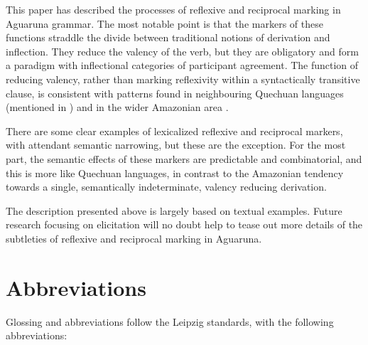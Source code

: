 \documentclass[output=paper]{langscibook}
\begin{document}
This paper has described the processes of reflexive and reciprocal marking in Aguaruna grammar. The most notable point is that the markers of these functions straddle the divide between traditional notions of derivation and inflection. They reduce the valency of the verb, but they are obligatory and form a paradigm with inflectional categories of participant agreement. The function of reducing valency, rather than marking reflexivity within a syntactically transitive clause, is
 consistent with patterns found in neighbouring Quechuan languages (mentioned in ) and in the wider Amazonian area \citep[187]{Birchall2014}.

There are some clear examples of lexicalized reflexive and reciprocal markers, with attendant semantic narrowing, but these are the exception. For the most part, the semantic effects of these markers are predictable and combinatorial, and this is more like Quechuan languages, in contrast to the Amazonian tendency towards a single, semantically indeterminate, valency reducing derivation.

The description presented above is largely based on textual examples. Future research focusing on elicitation will no doubt help to tease out more details of the subtleties of reflexive and reciprocal marking in
Aguaruna.

\section*{Abbreviations}

Glossing and abbreviations follow the Leipzig standards, with the following abbreviations:\medskip
\end{document}
